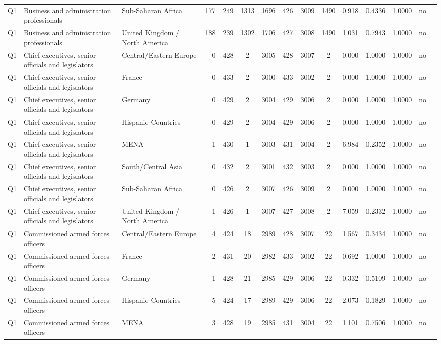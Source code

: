 \begin{longtable}{lllrcccccccccll}
Q1 & Business and administration professionals & Sub-Saharan Africa & 177 & 249 & 1313 & 1696 & 426 & 3009 & 1490 & 0.918 & 0.4336 & 1.0000 & no \\
Q1 & Business and administration professionals & United Kingdom / North America & 188 & 239 & 1302 & 1706 & 427 & 3008 & 1490 & 1.031 & 0.7943 & 1.0000 & no \\
Q1 & Chief executives, senior officials and legislators & Central/Eastern Europe & 0 & 428 & 2 & 3005 & 428 & 3007 & 2 & 0.000 & 1.0000 & 1.0000 & no \\
Q1 & Chief executives, senior officials and legislators & France & 0 & 433 & 2 & 3000 & 433 & 3002 & 2 & 0.000 & 1.0000 & 1.0000 & no \\
Q1 & Chief executives, senior officials and legislators & Germany & 0 & 429 & 2 & 3004 & 429 & 3006 & 2 & 0.000 & 1.0000 & 1.0000 & no \\
Q1 & Chief executives, senior officials and legislators & Hispanic Countries & 0 & 429 & 2 & 3004 & 429 & 3006 & 2 & 0.000 & 1.0000 & 1.0000 & no \\
Q1 & Chief executives, senior officials and legislators & MENA & 1 & 430 & 1 & 3003 & 431 & 3004 & 2 & 6.984 & 0.2352 & 1.0000 & no \\
Q1 & Chief executives, senior officials and legislators & South/Central Asia & 0 & 432 & 2 & 3001 & 432 & 3003 & 2 & 0.000 & 1.0000 & 1.0000 & no \\
Q1 & Chief executives, senior officials and legislators & Sub-Saharan Africa & 0 & 426 & 2 & 3007 & 426 & 3009 & 2 & 0.000 & 1.0000 & 1.0000 & no \\
Q1 & Chief executives, senior officials and legislators & United Kingdom / North America & 1 & 426 & 1 & 3007 & 427 & 3008 & 2 & 7.059 & 0.2332 & 1.0000 & no \\
Q1 & Commissioned armed forces officers & Central/Eastern Europe & 4 & 424 & 18 & 2989 & 428 & 3007 & 22 & 1.567 & 0.3434 & 1.0000 & no \\
Q1 & Commissioned armed forces officers & France & 2 & 431 & 20 & 2982 & 433 & 3002 & 22 & 0.692 & 1.0000 & 1.0000 & no \\
Q1 & Commissioned armed forces officers & Germany & 1 & 428 & 21 & 2985 & 429 & 3006 & 22 & 0.332 & 0.5109 & 1.0000 & no \\
Q1 & Commissioned armed forces officers & Hispanic Countries & 5 & 424 & 17 & 2989 & 429 & 3006 & 22 & 2.073 & 0.1829 & 1.0000 & no \\
Q1 & Commissioned armed forces officers & MENA & 3 & 428 & 19 & 2985 & 431 & 3004 & 22 & 1.101 & 0.7506 & 1.0000 & no \\

\end{longtable}
